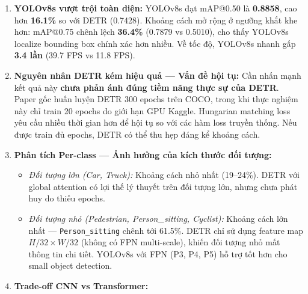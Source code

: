 \documentclass[a4paper]{article}
\theoremstyle{definition}
\begin{document}
\begin{enumerate}
	\item \textbf{YOLOv8s vượt trội toàn diện:} YOLOv8s đạt mAP@0.50 là \textbf{0.8858}, cao hơn \textbf{16.1\%} so với DETR (0.7428). Khoảng cách mở rộng ở ngưỡng khắt khe hơn: mAP@0.75 chênh lệch \textbf{36.4\%} (0.7879 vs 0.5010), cho thấy YOLOv8s localize bounding box chính xác hơn nhiều. Về tốc độ, YOLOv8s nhanh gấp \textbf{3.4 lần} (39.7 FPS vs 11.8 FPS).

	\item \textbf{Nguyên nhân DETR kém hiệu quả --- Vấn đề hội tụ:} Cần nhấn mạnh kết quả này \textbf{chưa phản ánh đúng tiềm năng thực sự của DETR}. Paper gốc huấn luyện DETR 300 epochs trên COCO, trong khi thực nghiệm này chỉ train 20 epochs do giới hạn GPU Kaggle. Hungarian matching loss yêu cầu nhiều thời gian hơn để hội tụ so với các hàm loss truyền thống. Nếu được train đủ epochs, DETR có thể thu hẹp đáng kể khoảng cách.

	\item \textbf{Phân tích Per-class --- Ảnh hưởng của kích thước đối tượng:}
	      \begin{itemize}
		      \item \textit{Đối tượng lớn (Car, Truck):} Khoảng cách nhỏ nhất (19--24\%). DETR với global attention có lợi thế lý thuyết trên đối tượng lớn, nhưng chưa phát huy do thiếu epochs.
		      \item \textit{Đối tượng nhỏ (Pedestrian, Person\_sitting, Cyclist):} Khoảng cách lớn nhất --- \texttt{Person\_sitting} chênh tới 61.5\%. DETR chỉ sử dụng feature map $H/32 \times W/32$ (không có FPN multi-scale), khiến đối tượng nhỏ mất thông tin chi tiết. YOLOv8s với FPN (P3, P4, P5) hỗ trợ tốt hơn cho small object detection.
	      \end{itemize}

	\item \textbf{Trade-off CNN vs Transformer:}


\end{enumerate}
\end{document}
